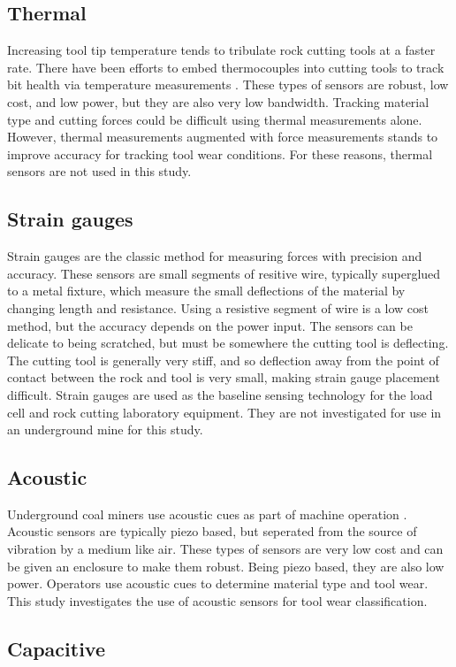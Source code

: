 \subsection{Thermal}
Increasing tool tip temperature tends to tribulate rock cutting tools at a faster rate.
There have been efforts to embed thermocouples into cutting tools 
to track bit health via temperature measurements \hlgr{[]}.
These types of sensors are robust, low cost, and low power, but they are also very low bandwidth.
Tracking material type and cutting forces could be difficult using thermal measurements alone.
However, thermal measurements augmented with force measurements stands to improve accuracy for 
tracking tool wear conditions. For these reasons, thermal sensors are not used in this study.

\subsection{Strain gauges}
Strain gauges are the classic method for measuring forces with precision and accuracy.
These sensors are small segments of resitive wire, typically superglued to a metal fixture, 
which measure the small deflections of the material by changing length and resistance.
Using a resistive segment of wire is a low cost method, but the accuracy depends on the power input.
The sensors can be delicate to being scratched, but must be somewhere the cutting tool is deflecting.
The cutting tool is generally very stiff, and so deflection away from the point of contact between the rock
and tool is very small, making strain gauge placement difficult.
Strain gauges are used as the baseline sensing technology for the load cell and rock cutting laboratory equipment.
They are not investigated for use in an underground mine for this study.

\subsection{Acoustic}
Underground coal miners use acoustic cues as part of machine operation \hlgr{[]}.
Acoustic sensors are typically piezo based, but seperated from the source of vibration by a medium like air.
These types of sensors are very low cost and can be given an enclosure to make them robust. 
Being piezo based, they are also low power. 
Operators use acoustic cues to determine material type and tool wear.
This study investigates the use of acoustic sensors for tool wear classification. 

\subsection{Capacitive}

